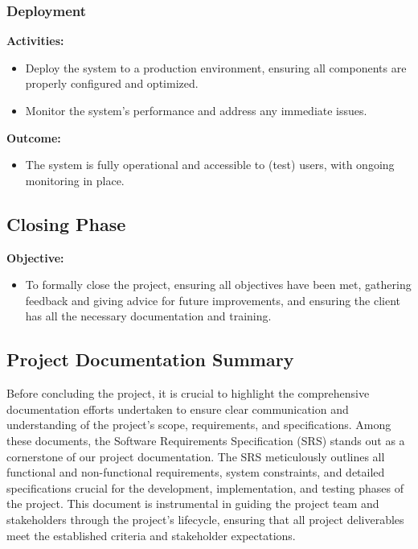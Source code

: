 \documentclass[12pt,a4paper]{article}
\begin{document}
\subsubsection{Deployment}

\noindent \textbf{Activities:}
\begin{itemize}
    \item Deploy the system to a production environment, ensuring all components are properly configured and optimized.
    \item Monitor the system's performance and address any immediate issues.
\end{itemize}

\noindent \textbf{Outcome:}
\begin{itemize}
    \item The system is fully operational and accessible to (test) users, with ongoing monitoring in place.
\end{itemize}

\subsection{Closing Phase}

\noindent \textbf{Objective:}
\begin{itemize}
    \item To formally close the project, ensuring all objectives have been met, gathering feedback and giving advice for future improvements, and ensuring the client has all the necessary documentation and training.
\end{itemize}
\subsection{Project Documentation Summary}
Before concluding the project, it is crucial to highlight the comprehensive documentation efforts undertaken to ensure clear communication and understanding of the project's scope, requirements, and specifications. Among these documents, the Software Requirements Specification (SRS) stands out as a cornerstone of our project documentation. The SRS meticulously outlines all functional and non-functional requirements, system constraints, and detailed specifications crucial for the development, implementation, and testing phases of the project. This document is instrumental in guiding the project team and stakeholders through the project's lifecycle, ensuring that all project deliverables meet the established criteria and stakeholder expectations.
\end{document}

